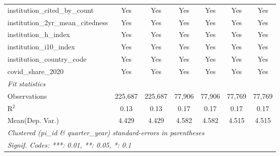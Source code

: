 \begin{tabular}{lcccccc}
   institution\_cited\_by\_count                               & Yes            & Yes           & Yes            & Yes            & Yes           & Yes\\  
   institution\_2yr\_mean\_citedness                           & Yes            & Yes           & Yes            & Yes            & Yes           & Yes\\  
   institution\_h\_index                                       & Yes            & Yes           & Yes            & Yes            & Yes           & Yes\\  
   institution\_i10\_index                                     & Yes            & Yes           & Yes            & Yes            & Yes           & Yes\\  
   institution\_country\_code                                  & Yes            & Yes           & Yes            & Yes            & Yes           & Yes\\  
   covid\_share\_2020                                          & Yes            & Yes           & Yes            & Yes            & Yes           & Yes\\  
   \midrule
   \emph{Fit statistics}\\
   Observations                                                & 225,687        & 225,687       & 77,906         & 77,906         & 77,769        & 77,769\\  
   R$^2$                                                       & 0.13           & 0.13          & 0.17           & 0.17           & 0.17          & 0.17\\  
Mean(Dep. Var.) & 4.429 & 4.429 & 4.582 & 4.582 & 4.515 & 4.515 \\
   \midrule \midrule
   \multicolumn{7}{l}{\emph{Clustered (pi\_id \& quarter\_year) standard-errors in parentheses}}\\
   \multicolumn{7}{l}{\emph{Signif. Codes: ***: 0.01, **: 0.05, *: 0.1}}\\
\end{tabular}
\par\endgroup
